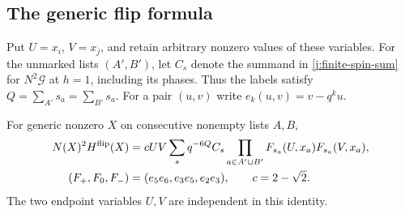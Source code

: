 \subsection{The generic flip formula}

Put $U=x_i$, $V=x_j$, and retain arbitrary nonzero values of these
variables. For the unmarked lists $(A',B')$, let $C_s$ denote the
summand in \eqref{j:finite-spin-sum} for $N^2\mathscr G$ at $h=1$,
including its phases. Thus the labels satisfy
$Q=\sum_{A'}s_a=\sum_{B'}s_a$. For a pair $(u,v)$ write
$e_k(u,v)=v-q^k u$.

\begin{proposition}\label{j:marked-flip-formula}
For generic nonzero $X$ on consecutive nonempty lists $A,B$,
\begin{equation}\label{c7:eq-L}
\begin{aligned}
 N(X)^2 H^{\rm flip}(X)
 &=cUV\sum_s q^{-6Q}C_s
       \prod_{a\in A'\cup B'}F_{s_a}(U,x_a)F_{s_a}(V,x_a),\\
 (F_+,F_0,F_-)&=(e_5e_6,e_3e_5,e_2e_3),\qquad c=2-\sqrt2.
\end{aligned}
\end{equation}
The two endpoint variables $U,V$ are independent in this identity.
\end{proposition}


